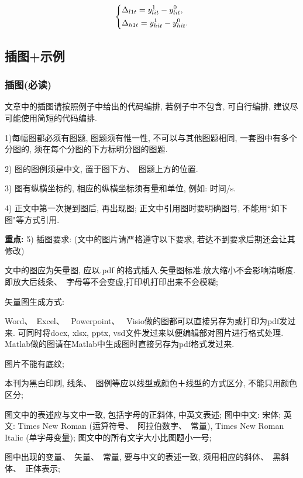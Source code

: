 \documentclass{setp-new}
\begin{document}
\begin{equation}\begin{dcases}
\Delta _{l1t} = y_{lit}^1 - y_{lit}^0,\\
\Delta _{h1t} = y_{hit}^1 - y_{hit}^0.
\end{dcases}\end{equation}


\subsection{插图+示例}

\subsubsection{插图(必读)}

文章中的插图请按照例子中给出的代码编排, 若例子中不包含, 可自行编排, 建议尽可能使用简短的代码编排.


1)每幅图都必须有图题, 图题须有惟一性, 不可以与其他图题相同, 一套图中有多个分图的, 须在每个分图的下方标明分图的图题.

2) 图的图例须是中文, 置于图下方、~图题上方的位置.

3) 图有纵横坐标的, 相应的纵横坐标须有量和单位, 例如: 时间/s.

4) 正文中第一次提到图后, 再出现图; 正文中引用图时要明确图号, 不能用``如下图"等方式引用.

{\bf 重点:} 5) 插图要求: (文中的图片请严格遵守以下要求, 若达不到要求后期还会让其修改)


 文中的图应为矢量图, 应以.pdf 的格式插入.矢量图标准:放大缩小不会影响清晰度.即放大后线条、~字母等不会变虚,打印机打印出来不会模糊;

矢量图生成方式:

Word、~Excel、~ Powerpoint、~ Visio做的图都可以直接另存为或打印为pdf发过来. 可同时将docx, xlsx, pptx, vsd文件发过来以便编辑部对图片进行格式处理. Matlab做的图请在Matlab中生成图时直接另存为pdf格式发过来.

 图片不能有底纹;

 本刊为黑白印刷, 线条、~图例等应以线型或颜色＋线型的方式区分, 不能只用颜色区分;

 图文中的表述应与文中一致, 包括字母的正斜体, 中英文表述; 图中中文: 宋体; 英文: Times New Roman (运算符号、~阿拉伯数字、~常量), Times New Roman  Italic (单字母变量); 图文中的所有文字大小比图题小一号;

 图中出现的变量、~矢量、~常量, 要与中文的表述一致, 须用相应的斜体、~黑斜体、~正体表示;
\end{document}
